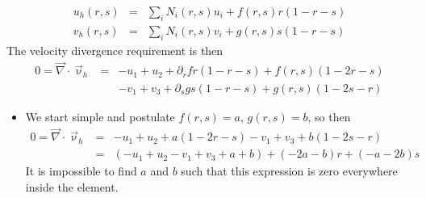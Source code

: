 \begin{eqnarray}
u_h(r,s)&=&\sum_i N_i(r,s) u_i + f(r,s) r(1-r-s) \\
v_h(r,s)&=&\sum_i N_i(r,s) v_i + g(r,s) s(1-r-s) 
\end{eqnarray}
The velocity divergence requirement is then
\begin{eqnarray}
0=\vec\nabla\cdot\vec\upnu_h 
&=& 
  -u_1+u_2 + \partial_r f r(1-r-s) + f(r,s)(1-2r-s) \\
&&-v_1+v_3 + \partial_s g s(1-r-s) + g(r,s)(1-2s-r)
\end{eqnarray}

\begin{itemize}
\item
We start simple and postulate $f(r,s)=a$, $g(r,s)=b$, so then 
\begin{eqnarray}
0=\vec\nabla\cdot\vec\upnu_h 
&=&   -u_1+u_2 +  a(1-2r-s) -v_1+v_3 +  b(1-2s-r) \\
&=&  (-u_1+u_2-v_1+v_3 +a +b ) + (-2a-b)r + (-a-2b)s
\end{eqnarray}
It is impossible to find $a$ and $b$ such that this expression is zero everywhere inside the element.


\end{itemize}
